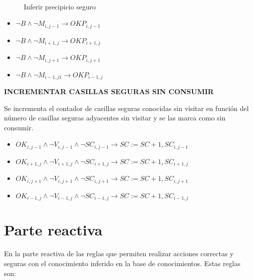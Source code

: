 \begin{figure}[htb]
\centering
  \hspace{1em}
  \\
  \hspace{1em}
  \caption{Inferir precipicio seguro}\label{fig:inferir_precipicio}
\end{figure}
\FloatBarrier

\begin{itemize}
    \item $\neg B \land \neg M_{i, j-1} \longrightarrow OKP_{i, j-1}$
    \item $\neg B \land \neg M_{i+1, j} \longrightarrow OKP_{i+1, j}$
    \item $\neg B \land \neg M_{i, j+1} \longrightarrow OKP_{i, j+1}$
    \item $\neg B \land \neg M_{i-1, j1} \longrightarrow OKP_{i-1, j}$
\end{itemize}

\centerline{\textbf{INCREMENTAR CASILLAS SEGURAS SIN CONSUMIR}}

Se incrementa el contador de casillas seguras conocidas sin visitar en función del número de casillas seguras adyacentes sin visitar y se las marca como sin consumir.

\begin{itemize}
    \item $OK_{i, j-1} \wedge \neg V_{i,j-1} \wedge \neg SC_{i, j-1} \longrightarrow SC := SC + 1, SC_{i,j-1}$
    \item $OK_{i+1, j} \wedge \neg V_{i+1,j} \wedge \neg SC_{i+1, j} \longrightarrow SC := SC + 1, SC_{i+1,j}$
    \item $OK_{i, j+1} \wedge \neg V_{i,j+1} \wedge \neg SC_{i, j+1} \longrightarrow SC := SC + 1, SC_{i,j+1}$
    \item $OK_{i-1, j} \wedge \neg V_{i-1,j} \wedge \neg SC_{i-1, j} \longrightarrow SC := SC + 1, SC_{i-1,j}$
\end{itemize}

\section{Parte reactiva}

En la parte reactiva de las reglas que permiten realizar acciones correctas y seguras con el conocimiento inferido en la base de conocimientos. Estas reglas son:

